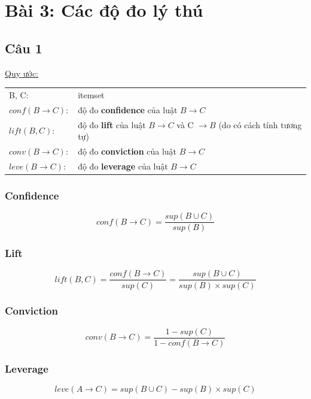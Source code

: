 \documentclass{article}
\begin{document}
\section{Bài 3: Các độ đo lý thú}\label{sec: prob3}
\subsection{Câu 1}
\begin{flushleft}
	\underline{Quy ước:}
	\begin{tabular}{l l}
		B, C: &  itemset\\
		$conf\left(B \to C\right)$: &  độ đo \textbf{confidence} của luật $B \to C$ \\
		$lift\left(B, C\right):$ &  độ đo \textbf{lift} của luật $B \to C$ và C $\to B$ (do có cách tính tương tự)\\
		$conv\left(B \to C\right):$ &  độ đo \textbf{conviction} của luật $B \to C$ \\ 
		$leve\left(B \to C\right):$ &  độ đo \textbf{leverage} của luật $B \to C$ \\
	\end{tabular}
\end{flushleft}
\subsubsection{Confidence}
\begin{equation}
	conf\left(B \to C \right) = \frac{sup \left( B \cup C \right)}{sup \left( B\right)}
\end{equation}
\subsubsection{Lift}
\begin{equation}
	lift\left( B,C \right) = \frac{conf\left( B \to C \right)}{sup \left( C \right)} = \frac{sup \left(B \cup C \right)}{sup \left( B\right) \times sup \left( C \right)}
\end{equation}
\subsubsection{Conviction}
\begin{equation}
	conv\left( B \to C \right) = \frac{1 - sup \left( C \right)}{1 - conf \left( B \to C \right)}
\end{equation}
\subsubsection{Leverage}
\begin{equation}
	leve(A \to C) = sup \left(B \cup C \right) - sup\left(B\right) \times sup\left(C\right)
\end{equation}
\end{document}
